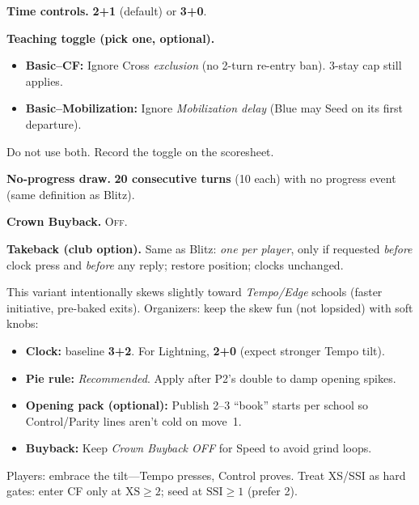 \documentclass[11pt]{article}
\begin{document}
\bigskip
\begin{rulevariant}[title={Lightning Canray (Bullet)}]
\small
\textbf{Time controls.} \textbf{2+1} (default) or \textbf{3+0}.

\textbf{Teaching toggle (pick one, optional).}
\begin{itemize}\itemsep=0.2em
  \item \textbf{Basic–CF:} Ignore Cross \emph{exclusion} (no 2-turn re-entry ban). 3-stay cap still applies.
  \item \textbf{Basic–Mobilization:} Ignore \emph{Mobilization delay} (Blue may Seed on its first departure).
\end{itemize}
Do not use both. Record the toggle on the scoresheet.

\textbf{No-progress draw.} \textbf{20 consecutive turns} (10 each) with no progress event (same definition as Blitz).

\textbf{Crown Buyback.} \textsc{Off}.

\textbf{Takeback (club option).} Same as Blitz: \emph{one per player}, only if requested \emph{before} clock press and \emph{before} any reply; restore position; clocks unchanged.
\end{rulevariant}

\bigskip

\begin{rulevariant}[title={Speed Canray — Meta Note}]
This variant intentionally skews slightly toward \emph{Tempo/Edge} schools (faster initiative, pre-baked exits).
Organizers: keep the skew fun (not lopsided) with soft knobs:
\begin{itemize}\itemsep0.2em
  \item \textbf{Clock:} baseline \textbf{3+2}. For Lightning, \textbf{2+0} (expect stronger Tempo tilt).
  \item \textbf{Pie rule:} \emph{Recommended}. Apply after P2’s double to damp opening spikes.
  \item \textbf{Opening pack (optional):} Publish 2–3 “book” starts per school so Control/Parity lines aren’t cold on move~1.
  \item \textbf{Buyback:} Keep \emph{Crown Buyback OFF} for Speed to avoid grind loops.
\end{itemize}
Players: embrace the tilt—Tempo presses, Control proves. Treat XS/SSI as hard gates: enter CF only at \(\mathrm{XS}\ge2\); seed at \(\mathrm{SSI}\ge1\) (prefer 2).
\end{rulevariant}
\end{document}

